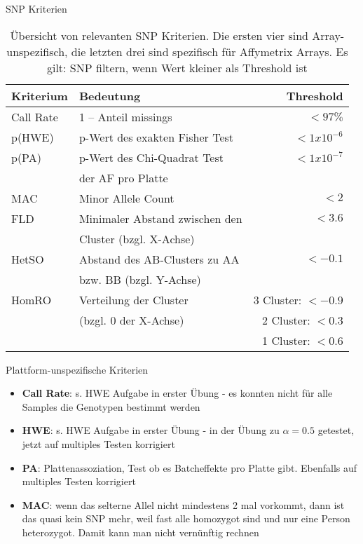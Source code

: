 \documentclass{beamer}
\begin{document}
\begin{frame}{SNP Kriterien}
\begin{table}[]
    \centering
    \begin{tabular}{l|l|r}
    Kriterium & Bedeutung & Threshold \\   
    \hline
    Call Rate & 1 – Anteil missings            &  $<97\%$  \\
    p(HWE)    & p-Wert des exakten Fisher Test & $<1x10^{-6}$ \\
    p(PA)     & p-Wert des Chi-Quadrat Test    & $<1x10^{-7}$  \\
              &  der AF pro Platte             & \\
    MAC       & Minor Allele Count             & $<2$ \\
    \hline
    FLD       & Minimaler Abstand zwischen den & $<3.6$  \\
              & Cluster (bzgl. X-Achse)        & \\
    HetSO     & Abstand des AB-Clusters zu AA  & $<-0.1$    \\
              &  bzw. BB (bzgl. Y-Achse)       & \\
    HomRO     &  Verteilung der Cluster        & 3 Cluster: $<-0.9$ \\
              &  (bzgl. 0 der X-Achse)         & 2 Cluster: $<0.3$  \\
              &                                & 1 Cluster: $<0.6$  
    \end{tabular}
    \caption{Übersicht von relevanten SNP Kriterien. Die ersten vier sind Array-unspezifisch, die letzten drei sind spezifisch für Affymetrix Arrays. Es gilt: SNP filtern, wenn Wert kleiner als Threshold ist}
    \label{tab:my_label}
\end{table}
\end{frame}

\begin{frame}{Plattform-unspezifische Kriterien}
    \begin{itemize}
        \item \textbf{Call Rate}: s. HWE Aufgabe in erster Übung - es konnten nicht für alle Samples die Genotypen bestimmt werden
        \item \textbf{HWE}: s. HWE Aufgabe in erster Übung - in der Übung zu $\alpha = 0.5$ getestet, jetzt auf multiples Testen korrigiert
        \item \textbf{PA}: Plattenassoziation, Test ob es Batcheffekte pro Platte gibt. Ebenfalls auf multiples Testen korrigiert
        \item \textbf{MAC}: wenn das selterne Allel nicht mindestens 2 mal vorkommt, dann ist das quasi kein SNP mehr, weil fast alle homozygot sind und nur eine Person heterozygot. Damit kann man nicht vernünftig rechnen
    \end{itemize}
\end{frame}
\end{document}
